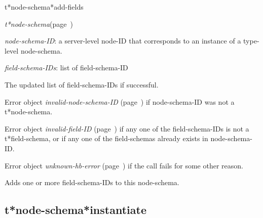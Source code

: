 \begin{description}
\item [Name:]  t*node-schema*add-fields

\item [Class:] {\sl t*node-schema}\hfill(page~\pageref{t*node-schema})

\item [Parameters:]
\item {\sl node-schema-ID}:  a server-level node-ID that corresponds to an 
instance of a type-level node-schema. 


\item {\sl field-schema-IDs}:  list of field-schema-ID


\item [Return-value:] 
The updated list of field-schema-IDs if successful.

Error object {\sl invalid-node-schema-ID} (page~\pageref{invalid-node-schema-ID}) if 
node-schema-ID was not a t*node-schema.

Error object {\sl invalid-field-ID} (page~\pageref{invalid-field-ID}) if any one of the 
field-schema-IDs is not a t*field-schema, or if any
one of the field-schemas already exists in node-schema-ID.

Error object {\sl unknown-hb-error} (page~\pageref{unknown-hb-error}) if the call 
fails for some other reason. 

\item [Description:]  Adds one or more field-schema-IDs to 
this node-schema.

\item [Public:]



\end{description}
\horizontalline

\subsection{t*node-schema*instantiate}
\label{t*node-schema*instantiate}

